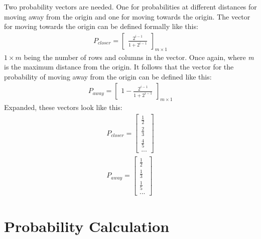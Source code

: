 \documentclass[letterpaper, 12pt]{report}
\begin{document}
Two probability vectors are needed. One for probabilities at different
distances for moving away from the origin and one for moving towards the
origin. The vector for moving towards the origin can be defined formally like
this:
\begin{align*}
	P_{closer}=
	\begin{bmatrix}
		\frac{2^{i-1}}{1+2^{i-1}}
	\end{bmatrix}
	_{m{\times}1}
\end{align*}
$1{\times}m$ being the number of rows and columns in the vector. Once again, where \textit{m} is the maximum distance from the origin. It follows that the vector for the probability of moving away from the origin can be defined like this:
\begin{align*}
	P_{away}=
	\begin{bmatrix}
		1- \frac{2^{i-1}}{1+2^{i-1}}
	\end{bmatrix}
	_{m{\times}1}
\end{align*}
Expanded, these vectors look like this:
\begin{align*}
	P_{closer}=
	\begin{bmatrix}
		\frac{1}{2} \\ \frac{2}{3} \\ \frac{4}{5} \\ ...
	\end{bmatrix}
	\\
	P_{away}=
	\begin{bmatrix}
		\frac{1}{2} \\ \frac{1}{3} \\ \frac{1}{5} \\ ...
	\end{bmatrix}
\end{align*}

\section{Probability Calculation}
\end{document}

